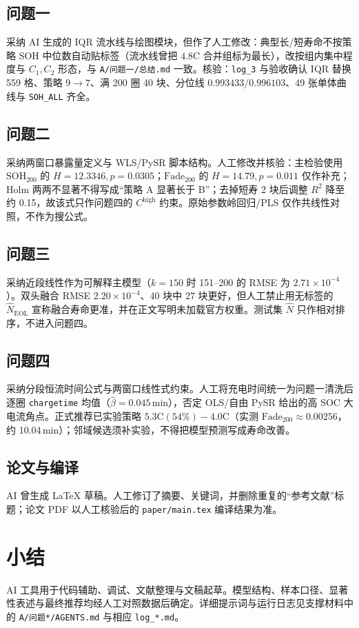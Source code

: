 \documentclass[a4paper,12pt,UTF8,zihao=-4]{ctexart}
\begin{document}
\subsection{问题一}

采纳 AI 生成的 IQR 流水线与绘图模块，但作了人工修改：典型长/短寿命不按策略 SOH 中位数自动贴标签（流水线曾把 \(4.8\mathrm{C}\) 合并组标为最长），改按组内集中程度与 \(C_1,C_2\) 形态，与 \texttt{A/问题一/总结.md} 一致。核验：\texttt{log\_3} 与验收确认 IQR 替换 559 格、策略 \(9\rightarrow 7\)、满 200 圈 40 块、分位线 \(0.993433/0.996103\)、49 张单体曲线与 \texttt{SOH\_ALL} 齐全。

\subsection{问题二}

采纳两窗口暴露量定义与 WLS/PySR 脚本结构。人工修改并核验：主检验使用 \(\mathrm{SOH}_{200}\) 的 \(H=12.3346,p=0.0305\)；\(\mathrm{Fade}_{200}\) 的 \(H=14.79,p=0.011\) 仅作补充；Holm 两两不显著不得写成“策略 A 显著长于 B”；去掉短寿 2 块后调整 \(R^2\) 降至约 0.15，故该式只作问题四的 \(C^{\mathrm{high}}\) 约束。原始参数岭回归/PLS 仅作共线性对照，不作为搜公式。

\subsection{问题三}

采纳近段线性作为可解释主模型（\(k=150\) 时 151--200 的 RMSE 为 \(2.71\times 10^{-4}\)）。双头融合 RMSE \(2.20\times 10^{-4}\)、40 块中 27 块更好，但人工禁止用无标签的 \(\hat N_{\mathrm{EOL}}\) 宣称融合寿命更准，并在正文写明未加载官方权重。测试集 \(\hat N\) 只作相对排序，不进入问题四。

\subsection{问题四}

采纳分段恒流时间公式与两窗口线性式约束。人工将充电时间统一为问题一清洗后逐圈 \texttt{chargetime} 均值（\(\hat\beta=0.045\)\,min），否定 OLS/自由 PySR 给出的高 SOC 大电流角点。正式推荐已实验策略 \(5.3\mathrm{C}(54\%)-4.0\mathrm{C}\)（实测 \(\mathrm{Fade}_{200}\approx 0.00256\)，约 10.04\,min）；邻域候选须补实验，不得把模型预测写成寿命改善。

\subsection{论文与编译}

AI 曾生成 LaTeX 草稿。人工修订了摘要、关键词，并删除重复的“参考文献”标题；论文 PDF 以人工核验后的 \texttt{paper/main.tex} 编译结果为准。

\section{小结}

AI 工具用于代码辅助、调试、文献整理与文稿起草。模型结构、样本口径、显著性表述与最终推荐均经人工对照数据后确定。详细提示词与运行日志见支撑材料中的 \texttt{A/问题*/AGENTS.md} 与相应 \texttt{log\_*.md}。
\end{document}
